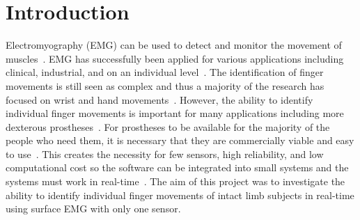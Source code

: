 \section{Introduction}
\label{section:intro}

Electromyography (EMG) can be used to detect and monitor the movement of muscles~\cite{emgIntro}. EMG has successfully been applied for various applications including clinical, industrial, and on an individual level~\cite{phinyomarkFeatureReductionSelection2012}. 
The identification of finger movements is still seen as complex and thus a majority of the research has focused on wrist and hand movements~\cite{sultanaSystematicReviewSurface2023}\cite{leeElectromyogramBasedClassificationHand2021}\cite{al-timemyClassificationFingerMovements2013}. However, the ability to identify individual finger movements is important for many applications including more dexterous prostheses~\cite{al-timemyClassificationFingerMovements2013}\cite{sultanaSystematicReviewSurface2023}. For prostheses to be available for the majority of the people who need them, it is necessary that they are commercially viable and easy to use~\cite{hristovClassificationIndividualCombined2022}. This creates the necessity for few sensors, high reliability, and low computational cost so the software can be integrated into small systems and the systems must work in real-time~\cite{hristovClassificationIndividualCombined2022}\cite{leeElectromyogramBasedClassificationHand2021}.
The aim of this project was to investigate the ability to identify individual finger movements of intact limb subjects in real-time using surface EMG with only one sensor.

\label{section:background}

\label{section:related_work}  

